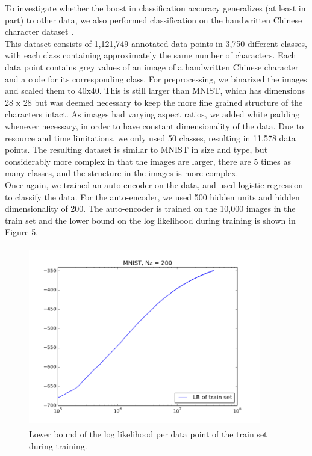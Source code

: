 \documentclass{article}
\begin{document}
To investigate whether the boost in classification accuracy generalizes (at least in part) to other data, we also performed classification on the handwritten Chinese character dataset \cite{liu2011casia}. \\
This dataset consists of 1,121,749 annotated data points in 3,750 different classes, with each class containing approximately the same number of characters. Each data point contains grey values of an image of a handwritten Chinese character and a code for its corresponding class. For preprocessing, we binarized the images and scaled them to 40x40. This is still larger than MNIST, which has dimensions 28 x 28 but was deemed necessary to keep the more fine grained structure of the characters intact. As images had varying aspect ratios, we added white padding whenever necessary, in order to have constant dimensionality of the data. Due to resource and time limitations, we only used 50 classes, resulting in 11,578 data points. The resulting dataset is similar to MNIST in size and type, but considerably more complex in that the images are larger, there are 5 times as many classes, and the structure in the images is more complex.\\
Once again, we trained an auto-encoder on the data, and used logistic regression to classify the data. For the auto-encoder, we used 500 hidden units and hidden dimensionality of 200. The auto-encoder is trained on the 10,000 images in the train set and the lower bound on the log likelihood during training is shown in Figure 5. 


\begin{figure}[htb]
\begin{center}
\includegraphics[height=3.1in,width=4in]{lowerboundchinese.png}
\caption{Lower bound of the log likelihood per data point of the train set during training.}
\end{center}
\end{figure}
\end{document}

